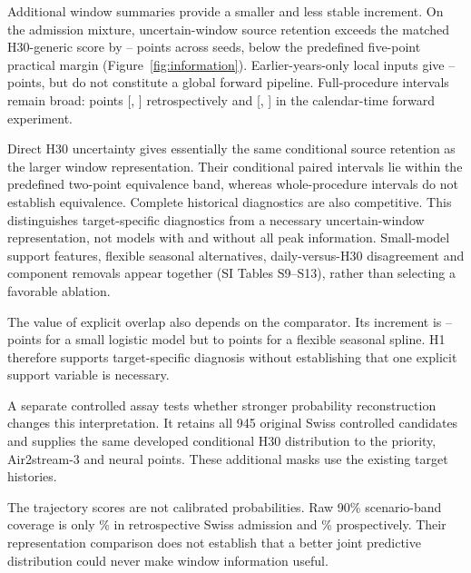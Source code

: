 Additional window summaries provide a smaller and less stable increment. On the admission mixture, uncertain-window source retention exceeds the matched H30-generic score by \RRetGainMin{}--\RRetGainMax{} points across seeds, below the predefined five-point practical margin (Figure~\ref{fig:information}). Earlier-years-only local inputs give \RPriorLocalGainMin{}--\RPriorLocalGainMax{} points, but do not constitute a global forward pipeline. Full-procedure intervals remain broad: \RWholeRetGain{} points [\RWholeRetLow{}, \RWholeRetHigh{}] retrospectively and \RWholePriorGain{} [\RWholePriorLow{}, \RWholePriorHigh{}] in the calendar-time forward experiment.

Direct H30 uncertainty gives essentially the same conditional source retention as the larger window representation. Their conditional paired intervals lie within the predefined two-point equivalence band, whereas whole-procedure intervals do not establish equivalence. Complete historical diagnostics are also competitive. This distinguishes target-specific diagnostics from a necessary uncertain-window representation, not models with and without all peak information. Small-model support features, flexible seasonal alternatives, daily-versus-H30 disagreement and component removals appear together (SI Tables S9--S13), rather than selecting a favorable ablation.

The value of explicit overlap also depends on the comparator. Its increment is \RSmallSupportMin{}--\RSmallSupportMax{} points for a small logistic model but \RSplineSupportMin{} to \RSplineSupportMax{} points for a flexible seasonal spline. H1 therefore supports target-specific diagnosis without establishing that one explicit support variable is necessary.



A separate controlled assay tests whether stronger probability reconstruction changes this interpretation. It retains all 945 original Swiss controlled candidates and supplies the same developed conditional H30 distribution to the priority, Air2stream-3 and neural points. These additional masks use the existing target histories.



The trajectory scores are not calibrated probabilities. Raw 90\% scenario-band coverage is only \RBandSwissRet{}\% in retrospective Swiss admission and \RBandSwissPrior{}\% prospectively. Their representation comparison does not establish that a better joint predictive distribution could never make window information useful.

